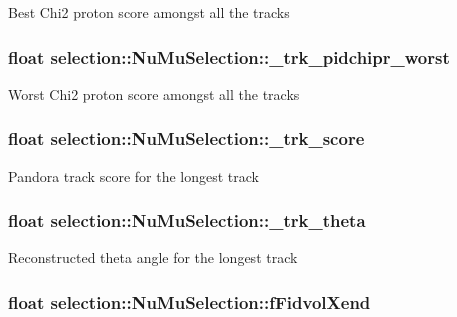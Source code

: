 Best Chi2 proton score amongst all the tracks \hypertarget{classselection_1_1NuMuSelection_a0373f32c36b713af9febf4e5e3b6899a}{
\subsubsection[{\-\_\-trk\-\_\-pidchipr\-\_\-worst}]{\setlength{\rightskip}{0pt plus 5cm}float selection\-::\-Nu\-Mu\-Selection\-::\-\_\-trk\-\_\-pidchipr\-\_\-worst\hspace{0.3cm}{\ttfamily [private]}}}\label{classselection_1_1NuMuSelection_a0373f32c36b713af9febf4e5e3b6899a}
Worst Chi2 proton score amongst all the tracks \hypertarget{classselection_1_1NuMuSelection_a2316596a59c6b87ea5aa75716c588117}{
\subsubsection[{\-\_\-trk\-\_\-score}]{\setlength{\rightskip}{0pt plus 5cm}float selection\-::\-Nu\-Mu\-Selection\-::\-\_\-trk\-\_\-score\hspace{0.3cm}{\ttfamily [private]}}}\label{classselection_1_1NuMuSelection_a2316596a59c6b87ea5aa75716c588117}
Pandora track score for the longest track \hypertarget{classselection_1_1NuMuSelection_a2041fd7980c1dbe98ce5a4c77a305167}{
\subsubsection[{\-\_\-trk\-\_\-theta}]{\setlength{\rightskip}{0pt plus 5cm}float selection\-::\-Nu\-Mu\-Selection\-::\-\_\-trk\-\_\-theta\hspace{0.3cm}{\ttfamily [private]}}}\label{classselection_1_1NuMuSelection_a2041fd7980c1dbe98ce5a4c77a305167}
Reconstructed theta angle for the longest track \hypertarget{classselection_1_1NuMuSelection_ab57daae1ee3ed13b58016eb68f0d6712}{
\subsubsection[{f\-Fidvol\-Xend}]{\setlength{\rightskip}{0pt plus 5cm}float selection\-::\-Nu\-Mu\-Selection\-::f\-Fidvol\-Xend\hspace{0.3cm}{\ttfamily [private]}}}\label{classselection_1_1NuMuSelection_ab57daae1ee3ed13b58016eb68f0d6712}
